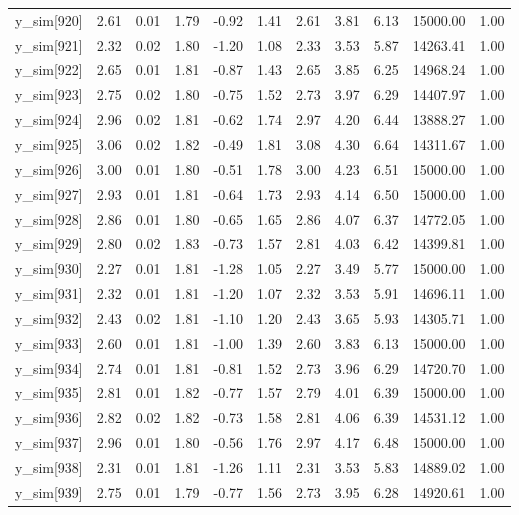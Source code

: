 \begin{table}[ht]
\begin{tabular}{rrrrrrrrrrr}
  y\_sim[920] & 2.61 & 0.01 & 1.79 & -0.92 & 1.41 & 2.61 & 3.81 & 6.13 & 15000.00 & 1.00 \\ 
  y\_sim[921] & 2.32 & 0.02 & 1.80 & -1.20 & 1.08 & 2.33 & 3.53 & 5.87 & 14263.41 & 1.00 \\ 
  y\_sim[922] & 2.65 & 0.01 & 1.81 & -0.87 & 1.43 & 2.65 & 3.85 & 6.25 & 14968.24 & 1.00 \\ 
  y\_sim[923] & 2.75 & 0.02 & 1.80 & -0.75 & 1.52 & 2.73 & 3.97 & 6.29 & 14407.97 & 1.00 \\ 
  y\_sim[924] & 2.96 & 0.02 & 1.81 & -0.62 & 1.74 & 2.97 & 4.20 & 6.44 & 13888.27 & 1.00 \\ 
  y\_sim[925] & 3.06 & 0.02 & 1.82 & -0.49 & 1.81 & 3.08 & 4.30 & 6.64 & 14311.67 & 1.00 \\ 
  y\_sim[926] & 3.00 & 0.01 & 1.80 & -0.51 & 1.78 & 3.00 & 4.23 & 6.51 & 15000.00 & 1.00 \\ 
  y\_sim[927] & 2.93 & 0.01 & 1.81 & -0.64 & 1.73 & 2.93 & 4.14 & 6.50 & 15000.00 & 1.00 \\ 
  y\_sim[928] & 2.86 & 0.01 & 1.80 & -0.65 & 1.65 & 2.86 & 4.07 & 6.37 & 14772.05 & 1.00 \\ 
  y\_sim[929] & 2.80 & 0.02 & 1.83 & -0.73 & 1.57 & 2.81 & 4.03 & 6.42 & 14399.81 & 1.00 \\ 
  y\_sim[930] & 2.27 & 0.01 & 1.81 & -1.28 & 1.05 & 2.27 & 3.49 & 5.77 & 15000.00 & 1.00 \\ 
  y\_sim[931] & 2.32 & 0.01 & 1.81 & -1.20 & 1.07 & 2.32 & 3.53 & 5.91 & 14696.11 & 1.00 \\ 
  y\_sim[932] & 2.43 & 0.02 & 1.81 & -1.10 & 1.20 & 2.43 & 3.65 & 5.93 & 14305.71 & 1.00 \\ 
  y\_sim[933] & 2.60 & 0.01 & 1.81 & -1.00 & 1.39 & 2.60 & 3.83 & 6.13 & 15000.00 & 1.00 \\ 
  y\_sim[934] & 2.74 & 0.01 & 1.81 & -0.81 & 1.52 & 2.73 & 3.96 & 6.29 & 14720.70 & 1.00 \\ 
  y\_sim[935] & 2.81 & 0.01 & 1.82 & -0.77 & 1.57 & 2.79 & 4.01 & 6.39 & 15000.00 & 1.00 \\ 
  y\_sim[936] & 2.82 & 0.02 & 1.82 & -0.73 & 1.58 & 2.81 & 4.06 & 6.39 & 14531.12 & 1.00 \\ 
  y\_sim[937] & 2.96 & 0.01 & 1.80 & -0.56 & 1.76 & 2.97 & 4.17 & 6.48 & 15000.00 & 1.00 \\ 
  y\_sim[938] & 2.31 & 0.01 & 1.81 & -1.26 & 1.11 & 2.31 & 3.53 & 5.83 & 14889.02 & 1.00 \\ 
  y\_sim[939] & 2.75 & 0.01 & 1.79 & -0.77 & 1.56 & 2.73 & 3.95 & 6.28 & 14920.61 & 1.00 \\ 

\end{tabular}
\end{table}

